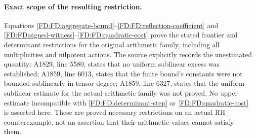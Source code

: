 \paragraph{Exact scope of the resulting restriction.}
Equations \eqref{FD:FD:aggregate-bound}--\eqref{FD:FD:reflection-coefficient}
and \eqref{FD:FD:signed-witness}--\eqref{FD:FD:quadratic-cost} prove the stated
frontier and determinant restrictions for the original arithmetic
family, including all multiplicities and nilpotent actions.  The source
explicitly records the unestimated quantity: A1829, line 5580, states
that no uniform sublinear excess was established; A1859, line 6013,
states that the finite bound's constants were not bounded sublinearly in
tensor degree; A1859, line 6327, states that the uniform sublinear
estimate for the actual arithmetic family was not proved.  No upper
estimate incompatible with \eqref{FD:FD:determinant-step} or
\eqref{FD:FD:quadratic-cost} is asserted here.  These are proved necessary
restrictions on an actual RH counterexample, not an assertion that their
arithmetic values cannot satisfy them.
